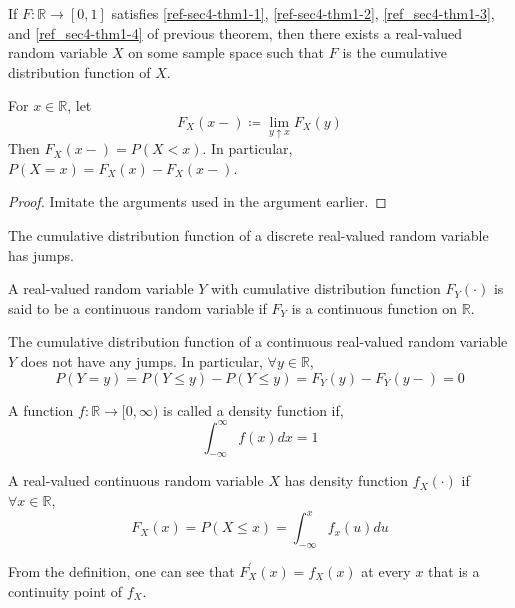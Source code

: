 \begin{theorem}
If $F : \mathbb{R} \rightarrow [0, 1]$ satisfies \ref{ref-sec4-thm1-1},
\ref{ref-sec4-thm1-2}, \ref{ref_sec4-thm1-3}, and \ref{ref_sec4-thm1-4} of
previous theorem, then there exists a real-valued random variable $X$ on some
sample space such that $F$ is the cumulative distribution function of $X$.
\end{theorem}

\begin{theorem}
For $x \in \mathbb{R}$, let 
\[
    F_X(x-) \coloneqq \lim_{y \uparrow x} F_X(y)
\]
Then $F_X(x-) = P(X < x)$. In particular, $P(X = x) = F_X(x) - F_X(x-)$.
\begin{proof}
Imitate the arguments used in the argument earlier.
\end{proof}
\end{theorem}

The cumulative distribution function of a discrete real-valued random variable
has jumps.

\begin{definition}
A real-valued random variable $Y$ with cumulative distribution function
$F_Y(\cdot)$ is said to be a continuous random variable if $F_Y$ is a
continuous function on $\mathbb{R}$.
\end{definition}

The cumulative distribution function of a continuous real-valued random
variable $Y$ does not have any jumps. In particular, $\forall y \in
\mathbb{R}$,
\[
    P(Y = y) = P(Y \leq y) - P(Y \leq y)
             = F_Y(y) - F_Y(y-)
             = 0
\]
\begin{definition}
A function $f : \mathbb{R} \rightarrow [0, \infty)$ is called a density
function if,
\[
    \int_{-\infty}^\infty f(x) dx = 1
\]
\end{definition}
\begin{definition}
A real-valued continuous random variable $X$ has density function $f_X(\cdot)$
if $\forall x \in \mathbb{R}$, 
\[
    F_X(x) = P(X \leq x) = \int_{-\infty}^x f_x(u) du
\]
\end{definition}
\note From the definition, one can see that $F_X^\prime(x) = f_X(x)$ at every
$x$ that is a continuity point of $f_X$.

